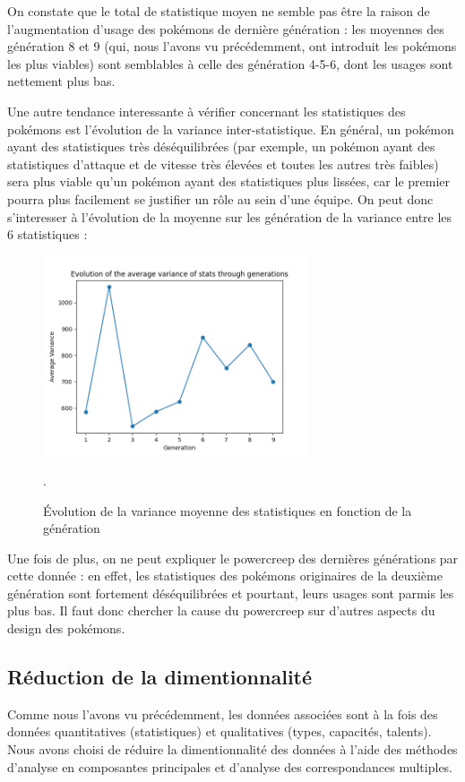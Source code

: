\documentclass[a4paper,12pt]{article}
\begin{document}
On constate que le total de statistique moyen ne semble pas être la raison de
l'augmentation d'usage des pokémons de dernière génération : les moyennes des
génération 8 et 9 (qui, nous l'avons vu précédemment, ont introduit les pokémons
les plus viables) sont semblables à celle des génération 4-5-6, dont les usages
sont nettement plus bas.

Une autre tendance interessante à vérifier concernant les statistiques des
pokémons est l'évolution de la variance inter-statistique. En général, un
pokémon ayant des statistiques très déséquilibrées (par exemple, un pokémon
ayant des statistiques d'attaque et de vitesse très élevées et toutes les autres
très faibles) sera plus viable qu'un pokémon ayant des statistiques plus
lissées, car le premier pourra plus facilement se justifier un rôle au sein
d'une équipe. On peut donc s'interesser à l'évolution de la moyenne sur les
génération de la variance entre les 6 statistiques :

\begin{figure}[htbp]
    \centering
    \includegraphics[width=0.7\textwidth]{Image/avg_var_stats_per_generation.png}
    \caption{Évolution de la variance moyenne des statistiques en fonction de la
    génération}.
    \label{fig:image6}
\end{figure}

Une fois de plus, on ne peut expliquer le powercreep des dernières générations
par cette donnée : en effet, les statistiques des pokémons originaires de la
deuxième génération sont fortement déséquilibrées et pourtant, leurs usages sont
parmis les plus bas. Il faut donc chercher la cause du powercreep sur d'autres
aspects du design des pokémons.

\subsection{Réduction de la dimentionnalité}
Comme nous l'avons vu précédemment, les données associées sont à la fois des
données quantitatives (statistiques) et qualitatives (types, capacités,
talents). Nous avons choisi de réduire la dimentionnalité des données à l'aide
des méthodes d'analyse en composantes principales et d'analyse des correspondances
multiples.
\end{document}
